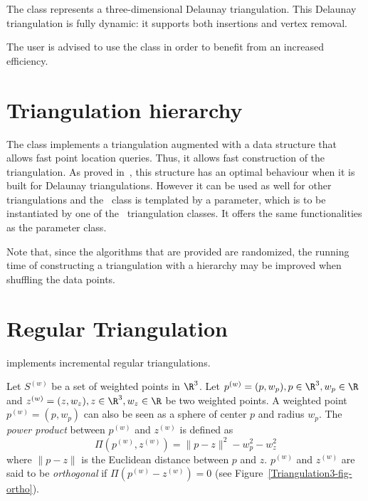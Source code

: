 The class 
represents a three-dimensional Delaunay triangulation. 
This Delaunay triangulation is fully dynamic: it supports both
insertions and vertex removal. 

The user is advised to use the class
 in order to benefit from an
increased efficiency. 

\section{Triangulation hierarchy} 

The class  implements a
triangulation augmented with a data structure that allows fast point
location queries. Thus, it allows fast construction of the
triangulation. As proved in~\cite{d-iirdt-98}, this structure has an
optimal behaviour when it is built for Delaunay triangulations.
However it can be used as well for other triangulations and the
\ccRefName\ class is templated by a parameter, which is to be
instantiated by one of the \cgal\ triangulation classes.  It offers
the same functionalities as the  parameter class. 

Note that, since the algorithms that are provided are randomized, the
running time of constructing a triangulation with a hierarchy may be
improved when shuffling the data points.

\section{Regular Triangulation} 
\label{Triangulation3-sec-class-Regulartriangulation}

implements incremental regular triangulations.

Let ${S}^{(w)}$ be a set of weighted points in $\R^3$. Let
${p}^{(w)}=(p,w_p), p\in\R^3, w_p\in\R$ and 
${z}^{(w)}=(z,w_z), z\in\R^3, w_z\in\R$ be two weighted points. 
A weighted point
${p}^{(w)}=(p,w_p)$ can also be seen as a sphere of center $p$ and
radius $w_p$. 
The \textit{power product} between ${p}^{(w)}$ and ${z}^{(w)}$ is
defined as 
\[\Pi({p}^{(w)},{z}^{(w)}) = {\|{p-z}\|^2-w_p^2-w_z^2}\]
where $\|{p-z}\|$ is the Euclidean distance between $p$ and $z$. 
 ${p}^{(w)}$ and ${z}^{(w)}$
are said to be \textit{orthogonal} if $\Pi{({p}^{(w)}-{z}^{(w)})}
= 0$ (see Figure~\ref{Triangulation3-fig-ortho}).

